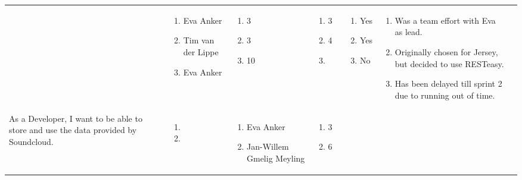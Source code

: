 \documentclass[11pt,a4paper]{article}
\begin{document}
\begin{table}[h]
\begin{tabular}{|p{4cm}|p{0.6cm}|p{2.0cm}|p{1.8cm}|p{1.8cm}|p{1.0cm}|p{5cm}}
& 
\begin{enumerate}[leftmargin=*,itemindent=0.1cm]
\item[] Eva Anker
\item[] Tim van der Lippe
\item[] Eva Anker
\end{enumerate}

& 
\begin{enumerate}[leftmargin=*,itemindent=0.1cm]
\item[] 3 
\item[] 3 
\item[] 10 
\end{enumerate}

&
\begin{enumerate}[leftmargin=*,itemindent=0.1cm]
\item[] 3 
\item[] 4 
\item[]
\end{enumerate}

&
\begin{enumerate}[leftmargin=*,itemindent=0.1cm]
\item[] Yes
\item[] Yes
\item[] No
\end{enumerate}

&
\begin{enumerate}[leftmargin=*,itemindent=0.1cm]
\item[] Was a team effort with Eva as lead.
\item[] Originally chosen for Jersey, but decided to use RESTeasy.
\item[] Has been delayed till sprint 2 due to running out of time.
\end{enumerate}
\\
As a Developer, I want to be able to store and use the data provided by Soundcloud. & \begin{enumerate}[leftmargin=*,itemindent=0.1cm]
\item 
\item
\end{enumerate}

& 
\begin{enumerate}[leftmargin=*,itemindent=0.1cm]
\item[] Eva Anker
\item[] Jan-Willem Gmelig Meyling
\end{enumerate}

& 
\begin{enumerate}[leftmargin=*,itemindent=0.1cm]
\item[] 3 
\item[] 6 
\end{enumerate}


\end{tabular}
\end{table}
\end{document}
